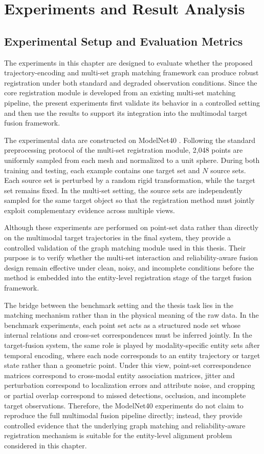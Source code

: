 \section{Experiments and Result Analysis}

\subsection{Experimental Setup and Evaluation Metrics}
The experiments in this chapter are designed to evaluate whether the proposed trajectory-encoding and multi-set graph matching framework can produce robust registration under both standard and degraded observation conditions. Since the core registration module is developed from an existing multi-set matching pipeline, the present experiments first validate its behavior in a controlled setting and then use the results to support its integration into the multimodal target fusion framework.

The experimental data are constructed on ModelNet40 \cite{wu2015shapenets}. Following the standard preprocessing protocol of the multi-set registration module, 2,048 points are uniformly sampled from each mesh and normalized to a unit sphere. During both training and testing, each example contains one target set and \(N\) source sets. Each source set is perturbed by a random rigid transformation, while the target set remains fixed. In the multi-set setting, the source sets are independently sampled for the same target object so that the registration method must jointly exploit complementary evidence across multiple views.

Although these experiments are performed on point-set data rather than directly on the multimodal target trajectories in the final system, they provide a controlled validation of the graph matching module used in this thesis. Their purpose is to verify whether the multi-set interaction and reliability-aware fusion design remain effective under clean, noisy, and incomplete conditions before the method is embedded into the entity-level registration stage of the target fusion framework.

The bridge between the benchmark setting and the thesis task lies in the matching mechanism rather than in the physical meaning of the raw data. In the benchmark experiments, each point set acts as a structured node set whose internal relations and cross-set correspondences must be inferred jointly. In the target-fusion system, the same role is played by modality-specific entity sets after temporal encoding, where each node corresponds to an entity trajectory or target state rather than a geometric point. Under this view, point-set correspondence matrices correspond to cross-modal entity association matrices, jitter and perturbation correspond to localization errors and attribute noise, and cropping or partial overlap correspond to missed detections, occlusion, and incomplete target observations. Therefore, the ModelNet40 experiments do not claim to reproduce the full multimodal fusion pipeline directly; instead, they provide controlled evidence that the underlying graph matching and reliability-aware registration mechanism is suitable for the entity-level alignment problem considered in this chapter.

